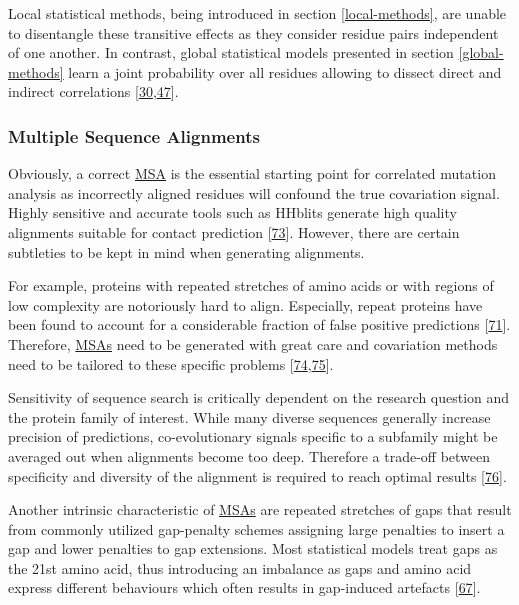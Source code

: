 \documentclass[12pt,a4paper,twoside]{book}
\theoremstyle{definition}
\theoremstyle{definition}
\theoremstyle{remark}
\begin{document}
Local statistical methods, being introduced in section
\ref{local-methods}, are unable to disentangle these transitive effects
as they consider residue pairs independent of one another. In contrast,
global statistical models presented in section \ref{global-methods}
learn a joint probability over all residues allowing to dissect direct
and indirect correlations
{[}\protect\hyperlink{ref-Weigt2009}{30},\protect\hyperlink{ref-Burger2010}{47}{]}.

\subsubsection*{Multiple Sequence
Alignments}\label{multiple-sequence-alignments}

Obviously, a correct \protect\hyperlink{abbrev}{MSA} is the essential
starting point for correlated mutation analysis as incorrectly aligned
residues will confound the true covariation signal. Highly sensitive and
accurate tools such as HHblits generate high quality alignments suitable
for contact prediction {[}\protect\hyperlink{ref-Remmert2012}{73}{]}.
However, there are certain subtleties to be kept in mind when generating
alignments.

For example, proteins with repeated stretches of amino acids or with
regions of low complexity are notoriously hard to align. Especially,
repeat proteins have been found to account for a considerable fraction
of false positive predictions
{[}\protect\hyperlink{ref-Anishchenko2017}{71}{]}. Therefore,
\protect\hyperlink{abbrev}{MSAs} need to be generated with great care
and covariation methods need to be tailored to these specific problems
{[}\protect\hyperlink{ref-Espada2014}{74},\protect\hyperlink{ref-Toth-Petroczy2016}{75}{]}.

Sensitivity of sequence search is critically dependent on the research
question and the protein family of interest. While many diverse
sequences generally increase precision of predictions, co-evolutionary
signals specific to a subfamily might be averaged out when alignments
become too deep. Therefore a trade-off between specificity and diversity
of the alignment is required to reach optimal results
{[}\protect\hyperlink{ref-Hopf2012}{76}{]}.

Another intrinsic characteristic of \protect\hyperlink{abbrev}{MSAs} are
repeated stretches of gaps that result from commonly utilized
gap-penalty schemes assigning large penalties to insert a gap and lower
penalties to gap extensions. Most statistical models treat gaps as the
21st amino acid, thus introducing an imbalance as gaps and amino acid
express different behaviours which often results in gap-induced
artefacts {[}\protect\hyperlink{ref-Feinauer2014}{67}{]}.
\end{document}

